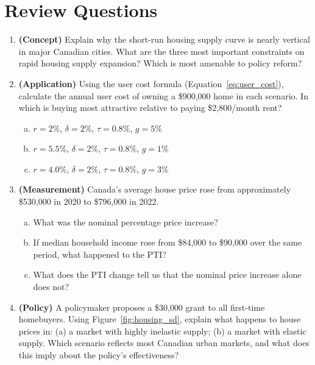 \section*{Review Questions}

\begin{enumerate}

\item \textbf{(Concept)} Explain why the short-run housing supply curve
is nearly vertical in major Canadian cities. What are the three most
important constraints on rapid housing supply expansion? Which is most
amenable to policy reform?

\item \textbf{(Application)} Using the user cost formula
(Equation~\ref{eq:user_cost}), calculate the annual user cost of owning
a \$900{,}000 home in each scenario. In which is buying most attractive
relative to paying \$2{,}800/month rent?
\begin{enumerate}[(a)]
  \item $r = 2\%$, $\delta = 2\%$, $\tau = 0.8\%$, $g = 5\%$
  \item $r = 5.5\%$, $\delta = 2\%$, $\tau = 0.8\%$, $g = 1\%$
  \item $r = 4.0\%$, $\delta = 2\%$, $\tau = 0.8\%$, $g = 3\%$
\end{enumerate}

\item \textbf{(Measurement)} Canada's average house price rose from
approximately \$530{,}000 in 2020 to \$796{,}000 in 2022.
\begin{enumerate}[(a)]
  \item What was the nominal percentage price increase?
  \item If median household income rose from \$84{,}000 to \$90{,}000
        over the same period, what happened to the PTI?
  \item What does the PTI change tell us that the nominal price increase alone does not?
\end{enumerate}

\item \textbf{(Policy)} A policymaker proposes a \$30{,}000 grant to
all first-time homebuyers. Using Figure~\ref{fig:housing_sd}, explain
what happens to house prices in: (a) a market with highly inelastic
supply; (b) a market with elastic supply. Which scenario reflects most
Canadian urban markets, and what does this imply about the policy's
effectiveness?


\end{enumerate}
